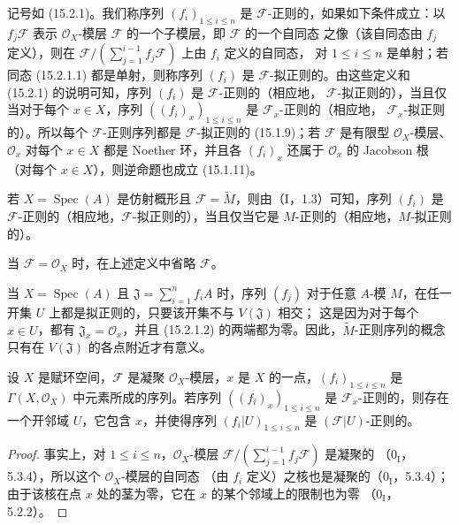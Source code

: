\begin{env}[15.2.2]
\label{0.15.2.2-fr}
记号如 (15.2.1)。我们称序列 $(f_i)_{1\leq i\leq n}$ 是
$\mathscr{F}$-正则的，如果如下条件成立：以 $f_j\mathscr{F}$ 表示
$\mathcal{O}_X$-模层 $\mathscr{F}$ 的一个子模层，即 $\mathscr{F}$ 的一个自同态
之像（该自同态由 $f_j$ 定义），则在
$\mathscr{F}/(\sum_{j=1}^{i-1}f_j\mathscr{F})$ 上由 $f_i$ 定义的自同态，
对 $1\leq i\leq n$ 是单射；若同态 (15.2.1.1) 都是单射，则称序列
$(f_i)$ 是 $\mathscr{F}$-拟正则的。由这些定义和
(15.2.1) 的说明可知，序列 $(f_i)$ 是 $\mathscr{F}$-正则的（相应地，
$\mathscr{F}$-拟正则的），当且仅当对于每个 $x\in X$，序列
$((f_i)_x)_{1\leq i\leq n}$ 是 $\mathscr{F}_x$-正则的（相应地，
$\mathscr{F}_x$-拟正则的）。所以每个 $\mathscr{F}$-正则序列都是
$\mathscr{F}$-拟正则的 (15.1.9)；若 $\mathscr{F}$ 是有限型
$\mathcal{O}_X$-模层、$\mathcal{O}_x$ 对每个 $x\in X$ 都是 Noether
环，并且各 $(f_i)_x$ 还属于 $\mathcal{O}_x$ 的 Jacobson 根（对每个
$x\in X$），则逆命题也成立 (15.1.11)。

若 $X=\operatorname{Spec}(A)$ 是仿射概形且
$\mathscr{F}=\widetilde{M}$，则由（I，1.3）可知，序列 $(f_i)$ 是
$\mathscr{F}$-正则的（相应地，$\mathscr{F}$-拟正则的），当且仅当它是
$M$-正则的（相应地，$M$-拟正则的）。

当 $\mathscr{F}=\mathcal{O}_X$ 时，在上述定义中省略 $\mathscr{F}$。
\end{env}

\begin{remark}[15.2.3]
\label{0.15.2.3-fr}
当 $X=\operatorname{Spec}(A)$ 且
$\mathfrak{J}=\sum_{i=1}^n f_iA$ 时，序列 $(f_j)$ 对于任意 $A$-模
$M$，在任一开集 $U$ 上都是拟正则的，只要该开集不与
$V(\mathfrak{J})$ 相交；
这是因为对于每个 $x\in U$，都有 $\mathfrak{J}_x=\mathcal{O}_x$，并且
(15.2.1.2) 的两端都为零。因此，$\widetilde{M}$-正则序列的概念只有在
$V(\mathfrak{J})$ 的各点附近才有意义。
\end{remark}

\begin{proposition}[15.2.4]
\label{0.15.2.4-fr}
设 $X$ 是赋环空间，$\mathscr{F}$ 是凝聚 $\mathcal{O}_X$-模层，$x$ 是
$X$ 的一点，$(f_i)_{1\leq i\leq n}$ 是
$\Gamma(X,\mathcal{O}_X)$ 中元素所成的序列。若序列
$((f_i)_x)_{1\leq i\leq n}$ 是 $\mathscr{F}_x$-正则的，则存在一个开邻域
$U$，它包含 $x$，并使得序列 $(f_i|U)_{1\leq i\leq n}$ 是
$(\mathscr{F}|U)$-正则的。
\end{proposition}

\begin{proof}
事实上，对 $1\leq i\leq n$，$\mathcal{O}_X$-模层
$\mathscr{F}/(\sum_{j=1}^{i-1}f_j\mathscr{F})$ 是凝聚的
（$0_{\mathrm I}$，5.3.4），所以这个 $\mathcal{O}_X$-模层的自同态
（由 $f_i$ 定义）之核也是凝聚的（$0_{\mathrm I}$，5.3.4）；
由于该核在点 $x$ 处的茎为零，它在 $x$ 的某个邻域上的限制也为零
（$0_{\mathrm I}$，5.2.2）。
\end{proof}

